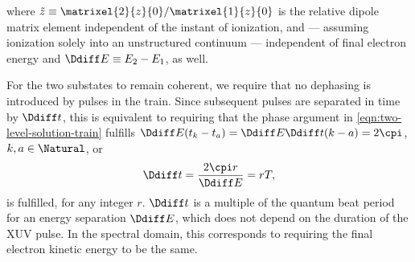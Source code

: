 where \(\tilde{z}\equiv\matrixel{2}{z}{0}/\matrixel{1}{z}{0}\) is the
relative dipole matrix element independent of the instant of
ionization, and --- assuming ionization solely into an unstructured
continuum --- independent of final electron energy and
\(\Ddiff E \equiv E_2 - E_1\), as well.

For the two substates to remain coherent, we require that no dephasing
is introduced by pulses in the train. Since subsequent pulses are
separated in time by \(\Ddiff t\), this is equivalent to requiring
that the phase argument in \eqref{eqn:two-level-solution-train}
fulfills \(\Ddiff E(t_k-t_a)=\Ddiff E\Ddiff t(k-a)=2\cpi\), \(k,a\in\Natural\), or
\begin{equation}
  \label{eqn:quantum-beat-condition}
  \Ddiff t = \frac{2\cpi r}{\Ddiff E}=rT,
\end{equation}
is fulfilled, for any integer \(r\). \(\Ddiff t\) is a multiple of the
quantum beat period for an energy separation \(\Ddiff E\), which does
not depend on the duration of the XUV pulse. In the spectral domain,
this corresponds to requiring the final electron kinetic energy to be
the same.

